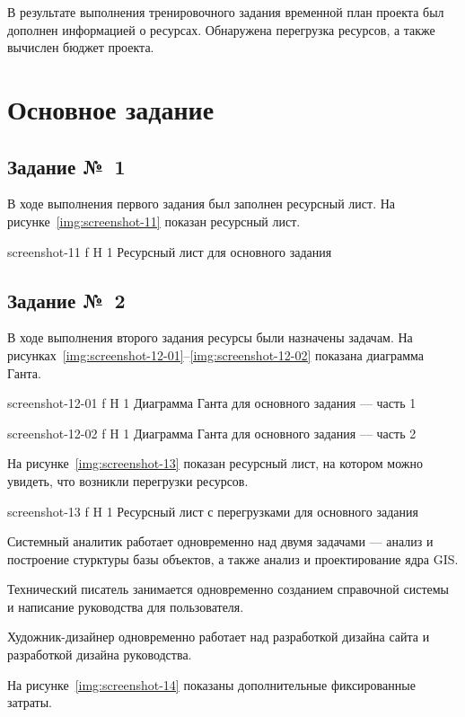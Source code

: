 \documentclass{bmstu}
\begin{document}
В результате выполнения тренировочного задания временной план проекта был дополнен информацией о ресурсах. 
Обнаружена перегрузка ресурсов, а также вычислен бюджет проекта.
    
\section{Основное задание}

\subsection{Задание №~1}

В ходе выполнения первого задания был заполнен ресурсный лист. 
На рисунке~\ref{img:screenshot-11} показан ресурсный лист.
    
    {screenshot-11}
    {f}
    {H}
    {1\textwidth}
    {Ресурсный лист для основного задания}

\subsection{Задание №~2}

В ходе выполнения второго задания ресурсы были назначены задачам. 
На рисунках~\ref{img:screenshot-12-01}--\ref{img:screenshot-12-02} показана диаграмма Ганта.
    
    {screenshot-12-01}
    {f}
    {H}
    {1\textwidth}
    {Диаграмма Ганта для основного задания --- часть 1}
    
    {screenshot-12-02}
    {f}
    {H}
    {1\textwidth}
    {Диаграмма Ганта для основного задания --- часть 2}
    
На рисунке~\ref{img:screenshot-13} показан ресурсный лист, на котором можно увидеть, что возникли перегрузки ресурсов.
    
    {screenshot-13}
    {f}
    {H}
    {1\textwidth}
    {Ресурсный лист с перегрузками для основного задания}
    
Системный аналитик работает одновременно над двумя задачами --- анализ и построение стурктуры базы объектов, а также анализ и проектирование ядра GIS.

Технический писатель занимается одновременно созданием справочной системы и написание руководства для пользователя.

Художник-дизайнер одновременно работает над разработкой дизайна сайта и разработкой дизайна руководства.

На рисунке~\ref{img:screenshot-14} показаны дополнительные фиксированные затраты.
    
\end{document}
